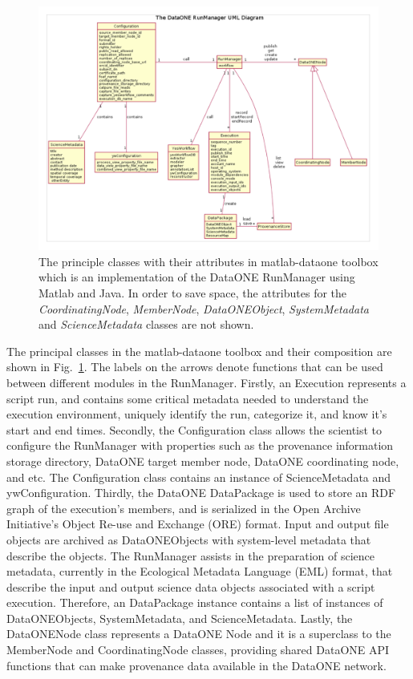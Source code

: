 \documentclass[runningheads,a4paper]{llncs}
\begin{document}
{\begin{figure}
\centering   
\includegraphics[width=1.2\textwidth]{RunManagerUML}
\caption{The principle classes with their attributes in matlab-dataone toolbox which is an implementation of the DataONE RunManager using Matlab and Java. In order to save space, the attributes for the \emph{CoordinatingNode}, \emph{MemberNode}, \emph{DataONEObject}, \emph{SystemMetadata} and \emph{ScienceMetadata} classes are not shown. }
\label{fig:runManagerComponents}
\end{figure}


The principal classes in the matlab-dataone toolbox and their composition are shown in Fig.~\ref{fig:runManagerComponents}. The labels on the arrows denote functions that can be used between different modules in the RunManager. Firstly, an Execution represents a script run, and contains some critical metadata needed to understand the execution environment, uniquely identify the run, categorize it, and know it's start and end times. Secondly, the Configuration class allows the scientist to configure the RunManager with properties such as the provenance information storage directory, DataONE target member node, DataONE coordinating node, and etc. The Configuration class contains an instance of ScienceMetadata and ywConfiguration. Thirdly, the DataONE DataPackage is used to store an RDF graph of the execution's members, and is serialized in the Open Archive Initiative's Object Re-use and Exchange (ORE) \cite{oaiore} format.  Input and output file objects are archived as DataONEObjects with system-level metadata that describe the objects. The RunManager assists in the preparation of science metadata, currently in the Ecological Metadata Language (EML) format, that describe the input and output science data objects associated with a script execution. Therefore, an DataPackage instance contains a list of instances of DataONEObjects, SystemMetadata, and ScienceMetadata. Lastly, the DataONENode class represents a DataONE Node and it is a superclass to the MemberNode and CoordinatingNode classes, providing shared DataONE API functions that can make provenance data available in the DataONE network. 

}
\end{document}
